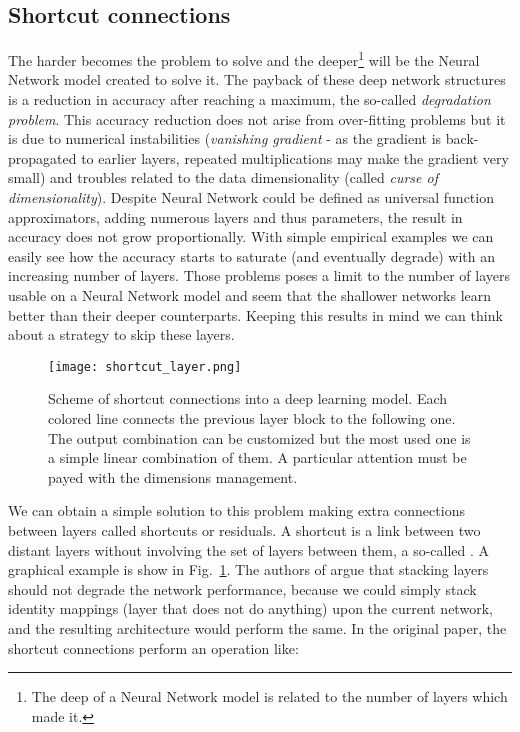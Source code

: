 \documentclass{standalone}
\begin{document}
\subsection[Shortcut]{Shortcut connections}\label{NN:shortcut}

The harder becomes the problem to solve and the deeper\footnote{
  The deep of a Neural Network model is related to the number of layers which made it.
} will be the Neural Network model created to solve it.
The payback of these deep network structures is a reduction in accuracy after reaching a maximum, the so-called \emph{degradation problem}.
This accuracy reduction does not arise from over-fitting problems but it is due to numerical instabilities (\emph{vanishing gradient} - as the gradient is back-propagated to earlier layers, repeated multiplications may make the gradient very small) and troubles related to the data dimensionality (called \emph{curse of dimensionality}).
Despite Neural Network could be defined as universal function approximators, adding numerous layers and thus parameters, the result in accuracy does not grow proportionally.
With simple empirical examples we can easily see how the accuracy starts to saturate (and eventually degrade) with an increasing number of layers.
Those problems poses a limit to the number of layers usable on a Neural Network model and seem that the shallower networks learn better than their deeper counterparts.
Keeping this results in mind we can think about a strategy to skip these  layers.

\begin{center}
\begin{figure}[htbp]
\centering
\texttt{[image: shortcut\_layer.png]}
\caption{Scheme of shortcut connections into a deep learning model.
Each colored line connects the previous layer block to the following one.
The output combination can be customized but the most used one is a simple linear combination of them.
A particular attention must be payed with the dimensions management.
}
\label{fig:shortcut}
\end{figure}
\end{center}

We can obtain a simple solution to this problem making extra connections between layers called shortcuts or residuals.
A shortcut is a link between two distant layers without involving the set of layers between them, a so-called .
A graphical example is show in Fig.~\ref{fig:shortcut}.
The authors of \cite{he2015deep} argue that stacking layers should not degrade the network performance, because we could simply stack identity mappings (layer that does not do anything) upon the current network, and the resulting architecture would perform the same.
In the original paper, the shortcut connections perform an operation like:
\end{document}
